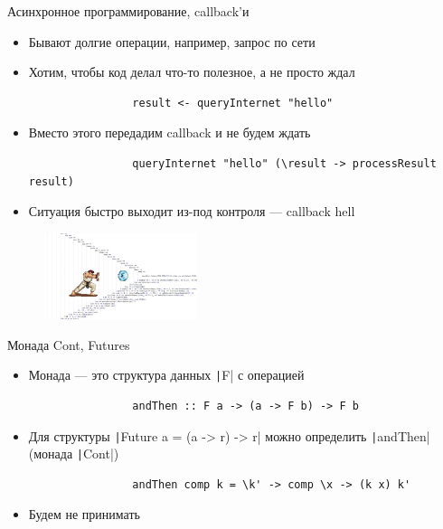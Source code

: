     \begin{frame}[fragile]{Асинхронное программирование, callback'и}
        \begin{itemize}
            \item Бывают долгие операции, например, запрос по сети
            \item Хотим, чтобы код делал что-то полезное, а не просто ждал
            \begin{verbatim}
                result <- queryInternet "hello"
            \end{verbatim}
            \item Вместо этого передадим callback и не будем ждать
            \begin{verbatim}
                queryInternet "hello" (\result -> processResult result)
            \end{verbatim}
            \item Ситуация быстро выходит из-под контроля --- callback hell
        \end{itemize}
        \begin{figure}[h]
            \centering
            \includegraphics[width=0.4\textwidth]{figs/callback-hell}
        \end{figure}
    \end{frame}

    \begin{frame}[fragile]{Монада Cont, Futures}
        \begin{itemize}
            \item Монада --- это структура данных \texttt|F| с операцией
            \begin{verbatim}
                andThen :: F a -> (a -> F b) -> F b
            \end{verbatim}
            \item Для структуры \texttt|Future a = (a -> r) -> r| можно определить \texttt|andThen| (монада \texttt|Cont|)
            \begin{verbatim}
                andThen comp k = \k' -> comp \x -> (k x) k'
            \end{verbatim}
            \item Будем не принимать

        \end{itemize}
    \end{frame}

